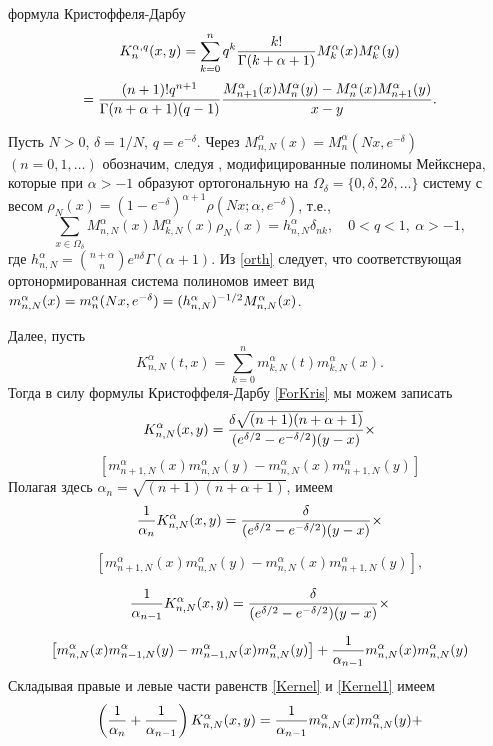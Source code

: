 формула Кристоффеля-Дарбу
$$
K_{n}^{\alpha,q}(x,y)=\sum_{k=0}^nq^k{k!\over
\Gamma(k+\alpha+1)}M_k^\alpha(x)M_k^\alpha(y)
$$
\begin{equation}\label{ForKris}
={(n+1)!q^{n+1}\over
\Gamma(n+\alpha+1)(q-1)}{M_{n+1}^\alpha(x)M_n^\alpha(y)-
M_n^\alpha(x)M_{n+1}^\alpha(y)\over x-y}.
\end{equation}


Пусть $N>0$,   $\delta=1/N$,   $q=e^{-\delta}$.
Через $M_{n,N}^\alpha(x)=M_n^\alpha(Nx,e^{-\delta})$ $(n=0, 1, \dots)$ обозначим, следуя \cite{Ram1}, модифицированные полиномы Мейкснера, которые при $\alpha>-1$ образуют ортогональную на $\Omega_{\delta}=\{0, \delta, 2\delta, \ldots\}$ систему с весом
$\rho_N(x)=(1-e^{-\delta})^{\alpha+1}\rho(Nx;\alpha,e^{-\delta})$, т.е.,
\begin{equation}\label{orth}
\sum_{x\in\Omega_{\delta}} M_{n,N}^\alpha(x)M_{k,N}^\alpha(x)\rho_N(x)=h_{n,N}^\alpha\delta_{nk}, \quad 0<q<1,
\ \alpha>-1,
\end{equation}
где $h_{n,N}^\alpha={n+\alpha\choose n}e^{n\delta}\Gamma(\alpha+1).$
Из \eqref{orth} следует, что соответствующая ортонормированная система полиномов имеет вид $m_{n,N}^\alpha(x)=m_n^\alpha(Nx,e^{-\delta})=\linebreak(h_{n,N}^{\alpha})^{-1/2}M_{n,N}^\alpha(x)$.

Далее, пусть
\begin{equation}\label{gadz-eq2}
 K_{n,N}^{\alpha}(t,x)=\sum_{k=0}^n m_{k,N}^{\alpha}(t)m_{k,N}^{\alpha}(x).
\end{equation}
Тогда в силу формулы Кристоффеля-Дарбу \eqref{ForKris} мы можем
записать
$$
K_{n,N}^\alpha (x,y)={\delta\sqrt{(n+1)(n+\alpha+1)}\over
(e^{\delta/2}-e^{-\delta/2})(y-x)}\times
$$
$$
\left[m_{n+1,N}^\alpha (x) m_{n,N}^\alpha (y)-
m_{n,N}^\alpha (x) m_{n+1,N}^\alpha (y) \right]
$$
Полагая здесь $\alpha_{n}=\sqrt{(n+1)(n+\alpha+1)}$, имеем
$$
{1\over \alpha_{n}} K_{n,N}^\alpha (x,y) =
{\delta\over (e^{\delta/2}-e^{-\delta/2})(y-x)}\times
$$

\begin{equation}\label{Kernel}
\left[m_{n+1,N}^\alpha(x)
m_{n,N}^\alpha(y)-m_{n,N}^\alpha(x)m_{n+1,N}^\alpha(y) \right],
\end{equation}

$$
{1\over \alpha_{n-1}} K_{n,N}^{\alpha}(x,y)=
{\delta\over (e^{\delta/2}-e^{-\delta/2})(y-x)}\times
$$

\begin{equation}\label{Kernel1}
\left[m_{n,N}^{\alpha}(x)
m_{n-1,N}^{\alpha}(y)-m_{n-1,N}^{\alpha}(x)
m_{n,N}^{\alpha}(y) \right]+
{1\over {\alpha}_{n-1}}m_{n,N}^{\alpha}(x)m_{n,N}^{\alpha}(y)
\end{equation}
Складывая правые и левые части равенств \eqref{Kernel} и \eqref{Kernel1} имеем
$$
\left({1\over\alpha_n}+ {1\over\alpha_{n-1}}\right)
K_{n,N}^\alpha(x,y)={1\over\alpha_{n-1}}m_{n,N}^\alpha(x)
m_{n,N}^\alpha(y)+
$$

